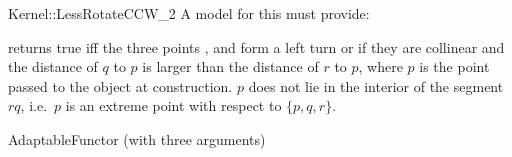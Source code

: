 \begin{ccRefFunctionObjectConcept}{Kernel::LessRotateCCW_2}
A model for this must provide:


{returns true iff the three points ,  
and  form a left turn or if they are collinear and
the distance of $q$ to $p$ is
larger than the distance of $r$ to $p$, where $p$ is the point
passed to the object at construction.
\ccPrecond $p$ does not lie in the interior of the segment $rq$,
i.e.~$p$ is an extreme point with respect to $\{p,q,r\}$.}

\ccRefines
AdaptableFunctor (with three arguments)

\end{ccRefFunctionObjectConcept}
